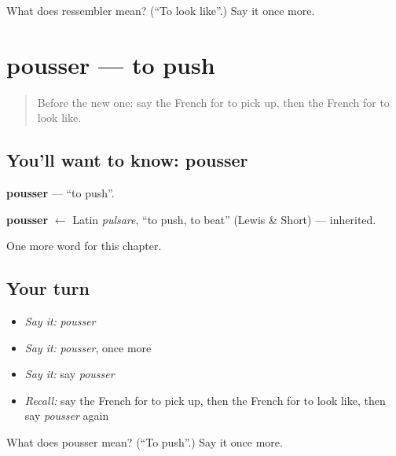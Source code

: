 \begin{tcolorbox}[breakable,colback=teal!4,colframe=teal!35!black,title={Before you move on}]
What does ressembler mean? (\textquotedblleft{}To look like\textquotedblright{}.) Say it once more.
\end{tcolorbox}
\section[pousser]{pousser — to push}

\label{lesson:FR-C181-pousser}



\begin{quote}
Before the new one: say the French for to pick up, then the French for to look like.
\end{quote}

\subsection*{You'll want to know: pousser}
\textbf{pousser} — \textquotedblleft{}to push\textquotedblright{}.

\begin{cousinweb}
\textbf{pousser} $\leftarrow$ Latin \emph{pulsare}, \textquotedblleft{}to push, to beat\textquotedblright{} (Lewis \& Short) — inherited.
\end{cousinweb}

\begin{grammarlens}[title={What you've built}]
One more word for this chapter.
\end{grammarlens}

\subsection*{Your turn}
\begin{itemize}
\raggedright
  \item \emph{Say it:} \emph{pousser}
  \item \emph{Say it:} \emph{pousser}, once more
  \item \emph{Say it:} say \emph{pousser}
  \item \emph{Recall:} say the French for to pick up, then the French for to look like, then say \emph{pousser} again
\end{itemize}

\begin{tcolorbox}[breakable,colback=teal!4,colframe=teal!35!black,title={Before you move on}]
What does pousser mean? (\textquotedblleft{}To push\textquotedblright{}.) Say it once more.
\end{tcolorbox}
